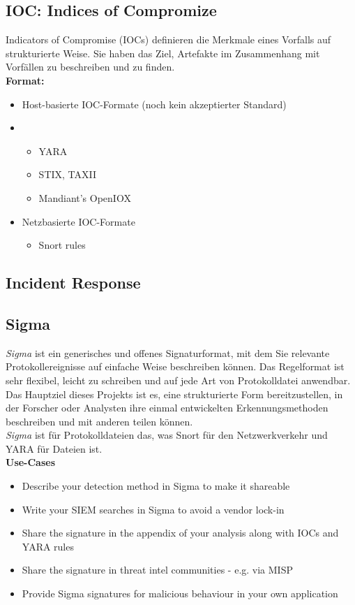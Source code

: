 \subsection{IOC: Indices of Compromize}
Indicators of Compromise (IOCs) definieren die Merkmale eines Vorfalls auf strukturierte Weise. Sie haben das Ziel, Artefakte im Zusammenhang mit Vorfällen zu beschreiben und zu finden.\\

\textbf{Format:}
\begin{itemize}
    \item Host-basierte IOC-Formate (noch kein akzeptierter Standard)
    \item 
    \begin{itemize}
        \item YARA
        \item STIX, TAXII
        \item Mandiant's OpenIOX
    \end{itemize}

    \item Netzbasierte IOC-Formate
    \begin{itemize}
        \item Snort rules
    \end{itemize}
\end{itemize}

\subsection{Incident Response}

\subsection{Sigma}
\textit{Sigma} ist ein generisches und offenes Signaturformat, mit dem Sie relevante Protokollereignisse auf einfache Weise beschreiben können.
Das Regelformat ist sehr flexibel, leicht zu schreiben und auf jede Art von Protokolldatei anwendbar.
Das Hauptziel dieses Projekts ist es, eine strukturierte Form bereitzustellen, in der Forscher oder Analysten ihre einmal entwickelten Erkennungsmethoden beschreiben und mit anderen teilen können.\\

\textit{Sigma} ist für Protokolldateien das, was Snort für den Netzwerkverkehr und YARA für Dateien ist.\\

\textbf{Use-Cases}
\begin{itemize}
    \item Describe your detection method in Sigma to make it shareable
    \item Write your SIEM searches in Sigma to avoid a vendor lock-in
    \item Share the signature in the appendix of your analysis along with IOCs and YARA rules
    \item Share the signature in threat intel communities - e.g. via MISP
    \item Provide Sigma signatures for malicious behaviour in your own application
\end{itemize}